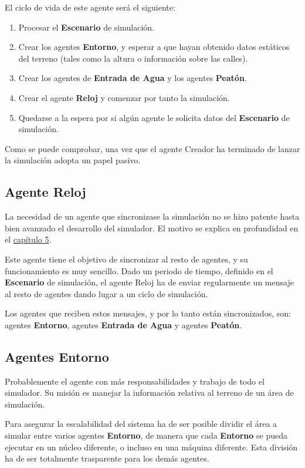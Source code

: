 El ciclo de vida de este agente será el siguiente:

\begin{enumerate}
 \item Procesar el {\bf Escenario} de simulación.
 \item Crear los agentes {\bf Entorno}, y esperar a que hayan obtenido datos
estáticos del terreno (tales como la altura o información sobre las calles).
 \item Crear los agentes de {\bf Entrada de Agua} y los agentes {\bf Peatón}.
 \item Crear el agente {\bf Reloj} y comenzar por tanto la simulación.
 \item Quedarse a la espera por si algún agente le solicita datos del
{\bf Escenario} de simulación.
\end{enumerate}

Como se puede comprobar, una vez que el agente Creador ha terminado de lanzar
la simulación adopta un papel pasivo.

\subsection*{Agente Reloj}

La necesidad de un agente que sincronizase la simulación no se hizo patente
hasta bien avanzado el desarrollo del simulador. El motivo se explica en
profundidad en el \hyperref[cap5]{capítulo 5}.

Este agente tiene el objetivo de sincronizar al resto de agentes, y su
funcionamiento es muy sencillo. Dado un periodo de tiempo, definido en el
{\bf Escenario} de simulación, el agente Reloj ha de enviar regularmente un
mensaje al resto de agentes dando lugar a un ciclo de simulación.

Los agentes que reciben estos mensajes, y por lo tanto están sincronizados,
son: agentes {\bf Entorno}, agentes {\bf Entrada de Agua} y agentes {\bf
Peatón}.

\subsection*{Agentes Entorno}

Probablemente el agente con más responsabilidades y trabajo de todo el
simulador. Su misión es manejar la información relativa al terreno de un área
de simulación.

Para asegurar la escalabilidad del sistema ha de ser posible dividir el área a
simular entre varios agentes {\bf Entorno}, de manera que cada {\bf Entorno} se
pueda ejecutar en un núcleo diferente, o incluso en una máquina diferente. Esta
división ha de ser totalmente trasparente para los demás agentes.

